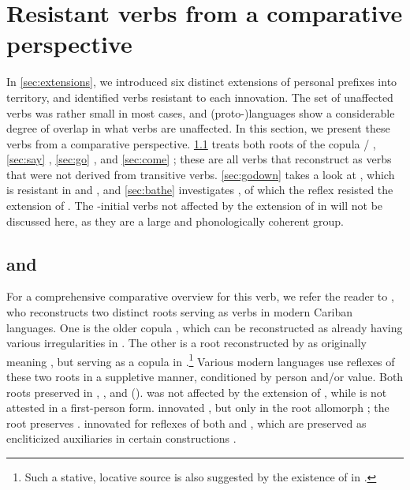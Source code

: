 \section{Resistant verbs from a comparative perspective}
\label{sec:verbs}
In \cref{sec:extensions}, we introduced six distinct extensions of personal prefixes into  territory, and identified verbs resistant to each innovation.
The set of unaffected verbs was rather small in most cases, and (proto-)languages show a considerable degree of overlap in what verbs are unaffected.
In this section, we present these verbs from a comparative perspective.
\cref{sec:be} treats both roots of the copula / , \cref{sec:say}  , \cref{sec:go}  , and \cref{sec:come}  ; these are all verbs that \textcite{gildea2007greenberg} reconstruct as  verbs that were not derived from transitive verbs.
\cref{sec:godown} takes a look at  , which is resistant in \PTir and \PPek, and  \cref{sec:bathe} investigates  , of which the \PPek reflex  resisted the extension of .
The -initial verbs not affected by the extension of  in \akuriyo {} will not be discussed here, as they are a large and phonologically coherent group.

\subsection{ and  }
\label{sec:be}
For a comprehensive comparative overview for this verb, we refer the reader to \textcite[375--382]{gildea2018reconstructing}, who reconstructs two distinct roots serving as verbs  in modern Cariban languages.
One is the older copula , which can be reconstructed as already having various irregularities in \PC.
The other is a root  reconstructed by \textcites{meira2009property}{gildea2018reconstructing} as originally meaning , but serving as a copula in \PC.\footnote{Such a stative, locative source is also suggested by the existence of   in \arara \parencite[196]{alves2017arara}.}
Various modern languages use reflexes of these two roots in a suppletive manner, conditioned by person and\slash{}or  value.
Both roots preserved   in \PPek, \PWai, and \PTir ().
\akuriyo {} was not affected by the extension of  , while  is not attested in a first-person form. 
\carijo innovated , but only in the  root allomorph ; the  root preserves  .
\yukpa innovated  for reflexes of both  and , which are preserved as encliticized auxiliaries in certain constructions .

